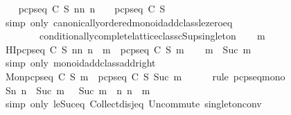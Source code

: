 \begin{isabellebody}
\ \ \isamarkupfalse%
\ {\isachardoublequoteopen}{\isasymUnion}{\isacharbraceleft}pcp{\isacharunderscore}seq\ C\ S\ n{\isacharbar}n{\isachardot}\ n\ {\isasymle}\ {}{\isacharbraceright}\ {\isacharequal}\ pcp{\isacharunderscore}seq\ C\ S\ {}{\isachardoublequoteclose}\isanewline
\ \ \ \ \isamarkupfalse%
\ {\isacharparenleft}simp\ only{\isacharcolon}\ canonically{\isacharunderscore}ordered{\isacharunderscore}monoid{\isacharunderscore}add{\isacharunderscore}class{\isachardot}le{\isacharunderscore}zero{\isacharunderscore}eq\ {}\ \isanewline
\ \ \ \ \ \ \ \ conditionally{\isacharunderscore}complete{\isacharunderscore}lattice{\isacharunderscore}class{\isachardot}cSup{\isacharunderscore}singleton{\isacharparenright}\isanewline
{}\isamarkupfalse%
\isanewline
\ \ \isamarkupfalse%
\ m\isanewline
\ \ \isamarkupfalse%
\ HI{\isacharcolon}{\isachardoublequoteopen}{\isasymUnion}{\isacharbraceleft}pcp{\isacharunderscore}seq\ C\ S\ n{\isacharbar}n{\isachardot}\ n\ {\isasymle}\ m{\isacharbraceright}\ {\isacharequal}\ pcp{\isacharunderscore}seq\ C\ S\ m{\isachardoublequoteclose}\isanewline
\ \ \isamarkupfalse%
\ {\isachardoublequoteopen}m\ {\isasymle}\ Suc\ m{\isachardoublequoteclose}\ \isanewline
\ \ \ \ \isamarkupfalse%
\ {\isacharparenleft}simp\ only{\isacharcolon}\ monoid{\isacharunderscore}add{\isacharunderscore}class{\isachardot}add{\isacharunderscore}{}{\isacharunderscore}right{\isacharparenright}\isanewline
\ \ \isamarkupfalse%
\ \isamarkupfalse%
\ Mon{\isacharcolon}{\isachardoublequoteopen}pcp{\isacharunderscore}seq\ C\ S\ m\ {\isasymsubseteq}\ pcp{\isacharunderscore}seq\ C\ S\ {\isacharparenleft}Suc\ m{\isacharparenright}{\isachardoublequoteclose}\isanewline
\ \ \ \ \isamarkupfalse%
\ {\isacharparenleft}rule\ pcp{\isacharunderscore}seq{\isacharunderscore}mono{\isacharparenright}\isanewline
\ \ \isamarkupfalse%
\ S{\isacharcolon}{\isachardoublequoteopen}{\isacharbraceleft}n{\isachardot}\ n\ {\isasymle}\ Suc\ m{\isacharbraceright}\ \ {\isacharequal}\ {\isacharbraceleft}Suc\ m{\isacharbraceright}\ {\isasymunion}\ {\isacharbraceleft}n{\isachardot}\ n\ {\isasymle}\ m{\isacharbraceright}{\isachardoublequoteclose}\isanewline
\ \ \ \ \isamarkupfalse%
\ {\isacharparenleft}simp\ only{\isacharcolon}\ le{\isacharunderscore}Suc{\isacharunderscore}eq\ Collect{\isacharunderscore}disj{\isacharunderscore}eq\ Un{\isacharunderscore}commute\ singleton{\isacharunderscore}conv{\isacharparenright}\isanewline

\end{isabellebody}
